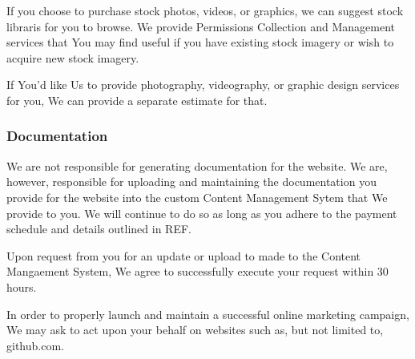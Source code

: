 {      If you choose to purchase stock photos, videos, or graphics, we can suggest stock libraris for you to browse. We provide Permissions Collection and Management services that You may find useful if you have existing stock imagery or wish to acquire new stock imagery.

      If You'd like Us to provide photography, videography, or graphic design services for you, We can provide a separate estimate for that.

      \subsubsection{Documentation}
      We are not responsible for generating documentation for the website. We are, however, responsible for uploading and maintaining the documentation you provide for the website into the custom Content Management Sytem that We provide to you. We will continue to do so as long as you adhere to the payment schedule and details outlined in REF.

      Upon request from you for an update or upload to made to the Content Mangaement System, We agree to successfully execute your request within 30 hours.

      In order to properly launch and maintain a successful online marketing campaign, We may ask to act upon your behalf on websites such as, but not limited to, github.com.
}
